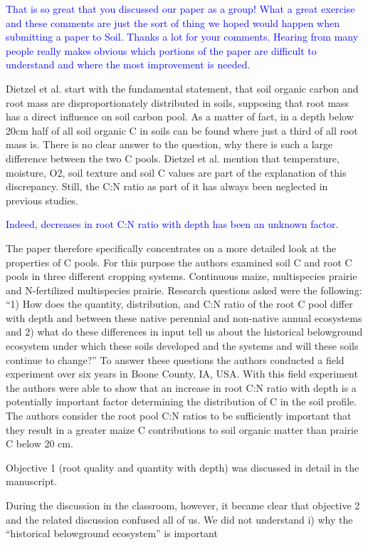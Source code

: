 \documentclass[]{article}
\begin{document}
\textcolor{blue}{That is so great that you discussed our paper as a group! What a great exercise and these comments are just the sort of thing we hoped would happen when submitting a paper to Soil. Thanks a lot for your comments. Hearing from many people really makes obvious which portions of the paper are difficult to understand and where the most improvement is needed.}

Dietzel et al. start with the fundamental statement, that soil organic
carbon and root mass are disproportionately distributed in soils,
supposing that root mass has a direct influence on soil carbon pool. As
a matter of fact, in a depth below 20cm half of all soil organic C in
soils can be found where just a third of all root mass is. There is no
clear answer to the question, why there is such a large difference
between the two C pools. Dietzel et al. mention that temperature,
moisture, O2, soil texture and soil C values are part of the explanation
of this discrepancy. Still, the C:N ratio as part of it has always been
neglected in previous studies.

\textcolor{blue}{Indeed, decreases in root C:N ratio with depth has been an unknown factor.}

The paper therefore specifically concentrates on a more detailed look at
the properties of C pools. For this purpose the authors examined soil C
and root C pools in three different cropping systems. Continuous maize,
multispecies prairie and N-fertilized multispecies prairie. Research
questions asked were the following: ``1) How does the quantity,
distribution, and C:N ratio of the root C pool differ with depth and
between these native perennial and non-native annual ecosystems and 2)
what do these differences in input tell us about the historical
belowground ecosystem under which these soils developed and the systems
and will these soils continue to change?'' To answer these questions the
authors conducted a field experiment over six years in Boone County, IA,
USA. With this field experiment the authors were able to show that an
increase in root C:N ratio with depth is a potentially important factor
determining the distribution of C in the soil profile. The authors
consider the root pool C:N ratios to be sufficiently important that they
result in a greater maize C contributions to soil organic matter than
prairie C below 20 cm.

Objective 1 (root quality and quantity with depth) was discussed in
detail in the manuscript.

During the discussion in the classroom, however, it became clear that
objective 2 and the related discussion confused all of us. We did not
understand i) why the ``historical belowground ecosystem'' is important
\end{document}

